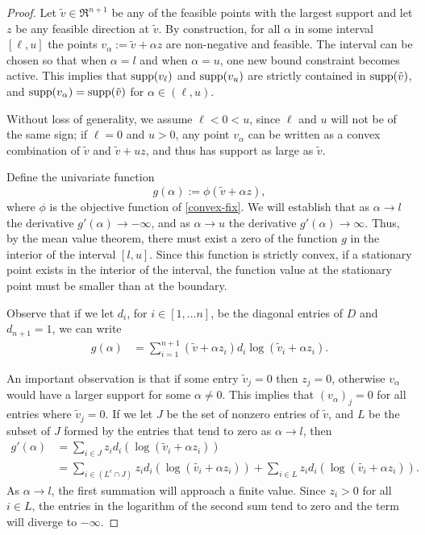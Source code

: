 \documentclass[smallextended]{svjour3}       %
\newcommand*{\supp}{\mbox{\rm supp}}
\newcommand*{\0}{\mathbf{0}}
\newcommand*{\1}{\mathbf{1}}
\begin{document}
\begin{proof}
	Let $\tilde{v}\in \Re^{n+1}$ be any of the feasible points with the largest
	support and let $z$ be any feasible direction at $\tilde{v}$. By
	construction, for all $\alpha$ in some interval $[\ell,u]$ the points
	$v_\alpha:= \tilde{v} + \alpha z$ are non-negative and feasible.  The
	interval can be chosen so that when $\alpha=l$ and when $\alpha=u$, one new
	bound constraint becomes active.  This implies that $\supp(v_\ell)$ and
	$\supp(v_u)$ are strictly contained in $\supp(\tilde{v})$, and
	$\supp(v_\alpha) = \supp(\tilde{v})$ for $\alpha \in (\ell,u)$.
	
	Without loss of generality, we assume $\ell<0<u$, since $\ell$ and $u$ will
	not be of the same sign; if $\ell = 0$ and $u>0$, any point $v_{\alpha}$ can
	be written as a convex combination of $\tilde{v}$ and $\tilde{v}+uz$, and
	thus has support as large as $\tilde{v}$.

	Define the univariate function 
	\begin{equation}   
		g(\alpha) := \phi(\tilde{v} + \alpha z), 
		\label{univariate}
	\end{equation} 
	where $\phi$ is the objective function of \eqref{convex-fix}.  We will
	establish that as $\alpha\rightarrow l$ the derivative $g'(\alpha)\rightarrow
	-\infty$, and as $\alpha\rightarrow u$ the derivative $g'(\alpha)\rightarrow
	\infty$.  Thus, by the mean value theorem, there must exist a zero of the 
	function $g$ in the	interior of the interval $[l,u]$.  Since this function is
	strictly convex, if a stationary point exists in the interior of the
	interval, the function value at the stationary point must be smaller than at
	the boundary.

	Observe that if we let $d_i$, for $i\in[1,\dots n]$, be the diagonal entries
	of $D$ and $d_{n+1}=1$, we can write 
  \begin{align*}
	 g(\alpha) &=\sum_{i=1}^{n+1} (\tilde{v} + \alpha z_i) d_i\log(\tilde{v}_i + \alpha z_i).
  \end{align*} 

	An important observation is that if some entry $\tilde{v}_j=0$ then $z_j=0$,
	otherwise $v_\alpha$ would have a larger support for some $\alpha \neq 0$.
	This implies that $(v_\alpha)_j=0$ for all entries where $\tilde{v}_j=0$.  If
	we let $J$ be the set of nonzero entries of $\tilde{v}$, and $L$ be the
	subset of $J$ formed by the entries that tend to zero as $\alpha \rightarrow
	l$, then 
   \begin{align*} 
	 	g'(\alpha) &=\sum_{i\in J} z_i d_i(\log(\tilde{v}_i + \alpha z_i)) \\            
		&= \sum_{i\in (L^c\cap J)} z_id_i(\log{(\tilde{v_i}+\alpha z_i)}) + \sum_{i\in L}
		 z_id_i(\log{(\tilde{v_i}+\alpha z_i)}). 
	\end{align*} 
	As $\alpha \rightarrow l$, the first summation will approach a finite value.
	Since $z_i>0$ for all $i\in L$, the entries in the logarithm of the second
	sum tend to zero and the term will diverge to $-\infty$.


\end{proof}
\end{document}
